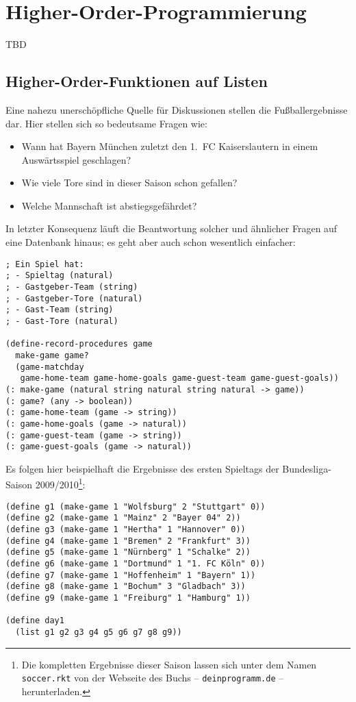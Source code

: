 
\chapter{Higher-Order-Programmierung}
\label{cha:higher-order}


TBD

\section{Higher-Order-Funktionen auf Listen}

Eine nahezu unerschöpfliche Quelle für Diskussionen stellen die
Fußballergebnisse dar.  Hier stellen sich so bedeutsame Fragen wie:
\begin{itemize}
\item Wann hat Bayern München zuletzt den 1.~FC Kaiserslautern in einem
  Auswärtsspiel geschlagen?
\item Wie viele Tore sind in dieser Saison schon gefallen?
\item Welche Mannschaft ist abstiegsgefährdet?
\end{itemize}
In letzter Konsequenz läuft die Beantwortung solcher und ähnlicher Fragen auf
eine Datenbank hinaus; es geht aber auch schon wesentlich einfacher:

\begin{verbatim}
; Ein Spiel hat:
; - Spieltag (natural)
; - Gastgeber-Team (string)
; - Gastgeber-Tore (natural)
; - Gast-Team (string)
; - Gast-Tore (natural)

(define-record-procedures game
  make-game game?
  (game-matchday 
   game-home-team game-home-goals game-guest-team game-guest-goals))
(: make-game (natural string natural string natural -> game))
(: game? (any -> boolean))
(: game-home-team (game -> string))
(: game-home-goals (game -> natural))
(: game-guest-team (game -> string))
(: game-guest-goals (game -> natural))
\end{verbatim}

Es folgen hier beispielhaft die Ergebnisse des ersten Spieltags der Bundesliga-Saison
2009/2010\footnote{Die kompletten Ergebnisse dieser Saison lassen sich unter dem Namen
\texttt{soccer.rkt} von der Webseite des Buchs -- \texttt{deinprogramm.de} --
herunterladen.}:
\begin{verbatim}
(define g1 (make-game 1 "Wolfsburg" 2 "Stuttgart" 0))
(define g2 (make-game 1 "Mainz" 2 "Bayer 04" 2))
(define g3 (make-game 1 "Hertha" 1 "Hannover" 0))
(define g4 (make-game 1 "Bremen" 2 "Frankfurt" 3))
(define g5 (make-game 1 "Nürnberg" 1 "Schalke" 2))
(define g6 (make-game 1 "Dortmund" 1 "1. FC Köln" 0))
(define g7 (make-game 1 "Hoffenheim" 1 "Bayern" 1))
(define g8 (make-game 1 "Bochum" 3 "Gladbach" 3))
(define g9 (make-game 1 "Freiburg" 1 "Hamburg" 1))

(define day1
  (list g1 g2 g3 g4 g5 g6 g7 g8 g9))
\end{verbatim}

